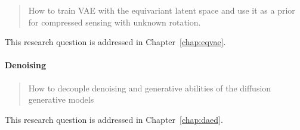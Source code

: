 \begin{quote}
	How to train VAE with the equivariant latent space and use it as a prior for compressed sensing with unknown rotation.
\end{quote}
This research question is addressed in Chapter~\ref{chap:eqvae}.


\paragraph{Denoising}
\begin{quote}
	How to decouple denoising and generative abilities of the diffusion generative models
\end{quote}
This research question is addressed in Chapter~\ref{chap:daed}.


